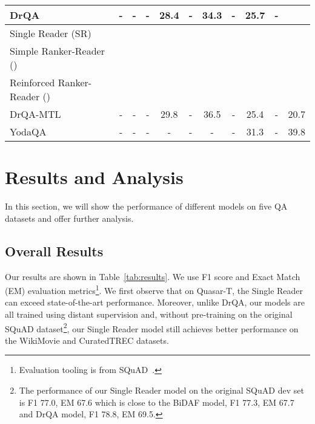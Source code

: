 \documentclass[letterpaper]{article} \usepackage{aaai18}  \usepackage{times}  \usepackage{helvet}  \usepackage{courier}  \usepackage{url}  \usepackage{graphicx}  \usepackage{comment}
\begin{document}
\begin{table*}[t]
\begin{tabular}{lcccccccccc}
DrQA~\cite{chen2017reading}             & -             & -             & -             & 28.4  & -                & 34.3        & -                & 25.7             & -                &                          \\
\midrule
Single Reader (SR)    &           &           &          &    &            &        &             &            &             &                          \\
Simple Ranker-Reader ()       &          &           &           &          &               &   &             &              &             &                           \\
Reinforced Ranker-Reader ()  &  &  &  &  &     &  &     &     &     &       \\
\hline
\hline
DrQA-MTL~\cite{chen2017reading}               & -             & -             & -             & 29.8     & -                & 36.5     & -                & 25.4             & -                & 20.7                         \\
YodaQA~\cite{baudivs2015modeling}           & -             & -             & -             & -          & -           & -                & -      & 31.3             & -                & 39.8                        \\
\bottomrule
\end{tabular}
\normalsize
\caption{Open-domain question answering results. The results show the average of 5 runs, with standard error in the superscript.  The CuratedTREC and WebQuestions models are initialized by training on SQuAD first. On the bottom, YodaQA and DrQA-MTL use additional resources (usage of KB for the former, and multiple training datasets for the latter), so are not a true apple-to-apple comparison to the other methods. EM: Exact Match.  }
\label{tab:results}
\end{table*}

\section{Results and Analysis}
In this section, we will show the performance of different models on five QA datasets and offer further analysis. 
\subsection{Overall Results}
Our results are shown in Table~\ref{tab:results}. We use F1 score and Exact Match (EM) evaluation metrics\footnote{Evaluation tooling is from SQuAD~\cite{rajpurkar2016squad}.}.  We first observe that on Quasar-T, the Single Reader can exceed state-of-the-art performance. Moreover, unlike DrQA, our models are all trained using distant supervision and, without pre-training on the original SQuAD dataset\footnote{The performance of our Single Reader model on the original SQuAD dev set is F1 77.0, EM 67.6 which is close to the BiDAF model, F1 77.3, EM 67.7 and DrQA model, F1 78.8, EM 69.5.}, our Single Reader model still achieves better performance on the WikiMovie and CuratedTREC datasets. 
\end{document}
